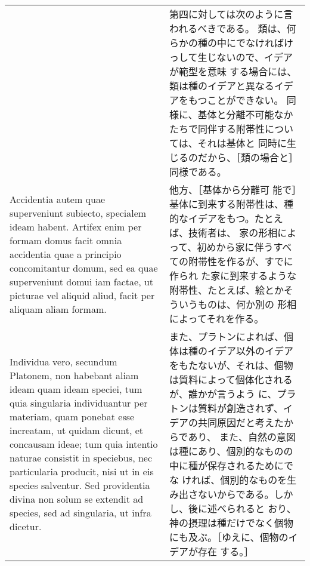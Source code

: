 \documentclass[10pt]{jsarticle} %
\begin{document}
\begin{longtable}{p{21em}p{21em}}
&

第四に対しては次のように言われるべきである。
類は、何らかの種の中にでなければけっして生じないので、イデアが範型を意味
 する場合には、類は種のイデアと異なるイデアをもつことができない。
同様に、基体と分離不可能なかたちで同伴する附帯性については、それは基体と
 同時に生じるのだから、［類の場合と］同様である。

\\

Accidentia autem quae superveniunt
subiecto, specialem ideam habent. Artifex enim per formam domus facit
omnia accidentia quae a principio concomitantur domum, sed ea quae
superveniunt domui iam factae, ut picturae vel aliquid aliud, facit per
aliquam aliam formam. 

&

他方、［基体から分離可
 能で］基体に到来する附帯性は、種的なイデアをもつ。たとえば、技術者は、
 家の形相によって、初めから家に伴うすべての附帯性を作るが、すでに作られ
 た家に到来するような附帯性、たとえば、絵とかそういうものは、何か別の
 形相によってそれを作る。


\\

Individua vero, secundum Platonem, non habebant
aliam ideam quam ideam speciei, tum quia singularia individuantur per
materiam, quam ponebat esse increatam, ut quidam dicunt, et concausam
ideae; tum quia intentio naturae consistit in speciebus, nec
particularia producit, nisi ut in eis species salventur. Sed providentia
divina non solum se extendit ad species, sed ad singularia, ut infra
dicetur.

&

また、プラトンによれば、個体は種のイデア以外のイデア
 をもたないが、それは、個物は質料によって個体化されるが、誰かが言うよう
 に、プラトンは質料が創造されず、イデアの共同原因だと考えたからであり、
 また、自然の意図は種にあり、個別的なものの中に種が保存されるためにでな
 ければ、個別的なものを生み出さないからである。しかし、後に述べられると
 おり、神の摂理は種だけでなく個物にも及ぶ。［ゆえに、個物のイデアが存在
 する。］


\end{longtable}
\end{document}
